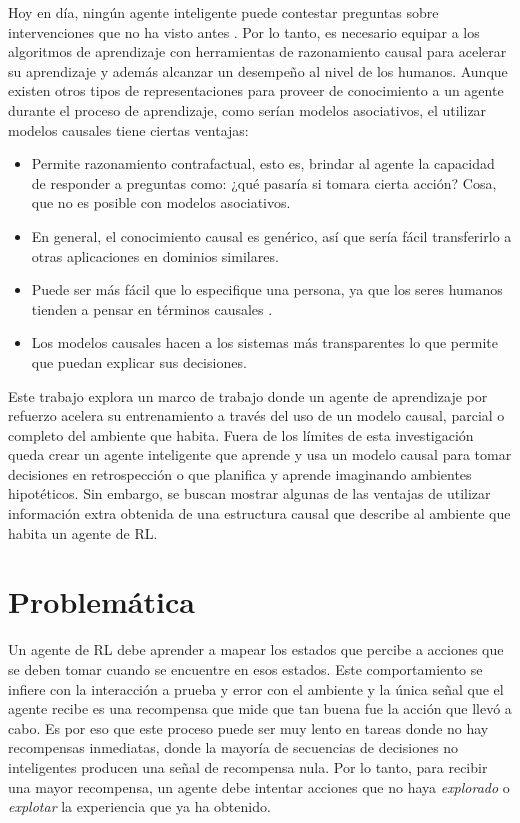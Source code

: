 Hoy en día, ningún agente inteligente puede contestar 
preguntas sobre intervenciones que no ha visto antes 
\cite{pearl2018theoretical}. Por lo tanto, es necesario equipar a
los algoritmos de aprendizaje con herramientas de razonamiento
causal para acelerar su aprendizaje y además alcanzar 
un desempeño al nivel de los humanos.
Aunque existen otros tipos de representaciones para proveer de
conocimiento a un agente durante el proceso de aprendizaje, como serían
modelos asociativos, el utilizar modelos causales tiene ciertas
ventajas:

\begin{itemize}
\item Permite razonamiento contrafactual, esto es, brindar al agente la
capacidad de responder a preguntas como: ¿qué pasaría si tomara cierta
acción? Cosa, que no es posible con modelos asociativos.
\item En general, el conocimiento causal es genérico, así que sería fácil
transferirlo a otras aplicaciones en dominios similares.
\item Puede ser más fácil que lo especifique una persona, ya que los seres humanos tienden a pensar en términos causales \cite{edmonds2018human, Gershman2017}.
\item Los modelos causales hacen a los sistemas más transparentes lo que permite que puedan explicar sus
decisiones.
\end{itemize}


Este trabajo explora un marco de trabajo donde un agente
de aprendizaje por refuerzo acelera su entrenamiento a través
del uso de un modelo causal, parcial o completo del ambiente
que habita. Fuera de los límites de
esta investigación queda
crear un agente inteligente que aprende y usa un modelo causal para tomar decisiones en retrospección o que
planifica y aprende imaginando ambientes hipotéticos.
Sin embargo, se buscan mostrar algunas de las ventajas de utilizar información extra obtenida de una estructura causal que 
describe al ambiente que habita un agente de RL.


\section{Problemática}

Un agente de RL debe aprender a mapear los estados
que percibe a acciones que se deben tomar cuando
se encuentre en esos estados. Este comportamiento
se infiere con la interacción a prueba y error con el ambiente y la única señal que el agente recibe es una recompensa que mide que tan buena fue la acción que llevó a cabo. Es por eso que este proceso puede ser muy lento en tareas donde no hay recompensas inmediatas, donde la mayoría de secuencias
de decisiones no inteligentes producen una señal de recompensa nula.
Por lo tanto, para recibir una mayor recompensa, un agente debe intentar acciones que no haya \textit{explorado} o \textit{explotar} la experiencia que ya ha obtenido.

